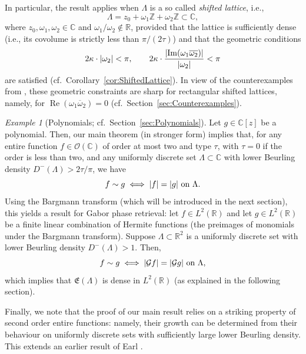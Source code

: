 \documentclass{article}
\newcommand{\bbC}{\mathbb{C}}
\newcommand{\bbR}{\mathbb{R}}
\newcommand{\bbZ}{\mathbb{Z}}
\newcommand{\calG}{\mathcal{G}}
\newcommand{\calO}{\mathcal{O}}
\DeclarePairedDelimiter{\abs}{\lvert}{\rvert}
\renewcommand{\Re}{\operatorname{Re}}
\renewcommand{\Im}{\operatorname{Im}}
\theoremstyle{remark}
\newtheorem{example}{Example}
\begin{document}
    In particular, the result applies when $\Lambda$ is a so called \emph{shifted lattice}, i.e.,
    \begin{equation*}
        \Lambda = z_0 + \omega_1 \bbZ + \omega_2 \bbZ \subset \mathbb{C},
    \end{equation*}
    where $z_0, \omega_1, \omega_2 \in \bbC$ and $\omega_1/\omega_2 \not\in \bbR$, provided that the lattice is sufficiently dense (i.e., its covolume is strictly less than $\pi/(2\tau)$) and that the geometric conditions
    \begin{equation*}
        2 \kappa \cdot \abs{\omega_2} < \pi, \qquad 2 \kappa \cdot \frac{\abs{\Im(\omega_1 \overline{\omega_2})}}{\abs{\omega_2}} < \pi
    \end{equation*}
    are satisfied (cf.~Corollary~\ref{cor:ShiftedLattice}). In view of the counterexamples from \cite{Alaifari2022Phase}, these geometric constraints are sharp for rectangular shifted lattices, namely, for $\Re(\omega_1 \overline \omega_2) = 0$ (cf.~Section~\ref{sec:Counterexamples}).

    \begin{example}[Polynomials; cf.~Section~\ref{sec:Polynomials}]
        Let $g \in \bbC[z]$ be a polynomial. Then, our main theorem (in stronger form) implies that, for any entire function $f \in \calO(\bbC)$ of order at most two and type $\tau$, with $\tau = 0$ if the order is less than two, and any uniformly discrete set $\Lambda \subset \bbC$ with lower Beurling density $D^{-}(\Lambda) > 2\tau/\pi$, we have
        \begin{equation*}
            f \sim g \iff \abs{f} = \abs{g} \text{ on } \Lambda.
        \end{equation*}
        Using the Bargmann transform (which will be introduced in the next section), this yields a result for Gabor phase retrieval: let $f \in L^2(\bbR)$ and let $g \in L^2(\bbR)$ be a finite linear combination of Hermite functions (the preimages of monomials under the Bargmann transform). Suppose $\Lambda \subset \bbR^2$ is a uniformly discrete set with lower Beurling density $D^{-}(\Lambda) > 1$. Then,
        \begin{equation*}
            f \sim g \iff \abs{\calG f} = \abs{\calG g} \text{ on } \Lambda,
        \end{equation*}
        which implies that $\mathfrak{E}(\Lambda)$ is dense in $L^2(\bbR)$ (as explained in the following section).
    \end{example}

    Finally, we note that the proof of our main result relies on a striking property of second order entire functions: namely, their growth can be determined from their behaviour on uniformly discrete sets with sufficiently large lower Beurling density. This extends an earlier result of Earl \cite{Earl1966On}.
\end{document}
